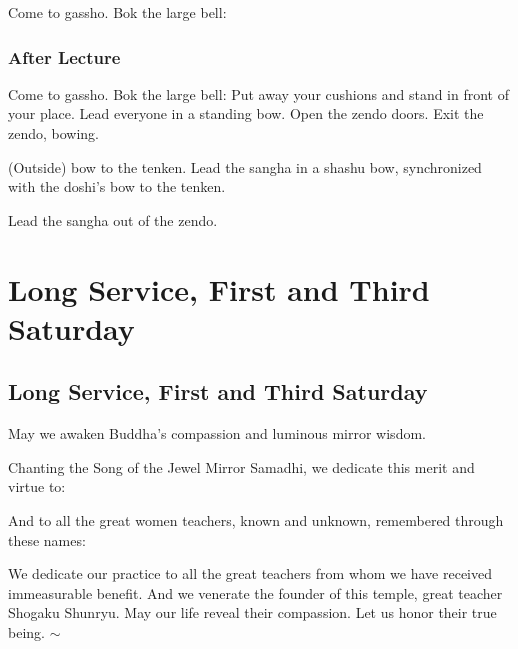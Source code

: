 \documentclass{kdo}
\begin{document}
\begin{services}
\doshi Come to gassho.
\doan Bok the large bell: \bigspace\bok
\sangha \sutraOpeningVerse*
\newpage

\section*{After Lecture}
\doshi Come to gassho.
\doan Bok the large bell: \bigspace\bok
\sangha \fourVows*
\sangha Put away your cushions and stand in front of your place.
\doshi Lead everyone in a standing bow.
\tenken Open the zendo doors.
\doshi Exit the zendo, bowing.

(Outside) bow to the tenken.
\doan Lead the sangha in a shashu bow, synchronized with the doshi's bow to
the tenken.

Lead the sangha out of the zendo.

\part{Long Service, First and Third Saturday}
\chapter{Long Service, First and Third Saturday}
\begin{service}
\kokyo \makaHannyaHaramittaShingyo
\kokyo \enmeiJukkuKannonGyo
\kokyo {}
\sangha \allBuddhas*
\kokyo \songOfTheJewelMirrorSamadhi
\kokyo May we awaken Buddha's compassion and luminous mirror wisdom.

Chanting the Song of the Jewel Mirror Samadhi, we dedicate this merit and
virtue to: \bigspace\clank

\begin{outdent}
  \ancestorsShort*
\end{outdent}

\kokyo And to all the great women teachers, known and unknown, remembered
through these names: \bigspace\clank

\begin{outdent}
  \femaleAncestors*
\end{outdent}

\kokyo We dedicate our practice to all the great teachers from whom we have
received immeasurable benefit. And we venerate the founder of this temple,
great teacher Shogaku Shunryu. May our life reveal their compassion. Let us
honor their true being. $\sim$ \largebell
\end{service}


\end{services}
\end{document}
